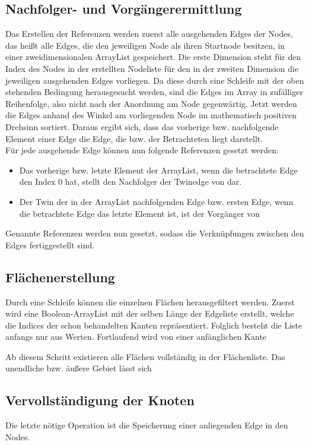 \subsection{Nachfolger- und Vorgängerermittlung}
Das Erstellen der Referenzen werden zuerst alle ausgehenden Edges der Nodes, das heißt alle Edges, die den jeweiligen Node als ihren Startnode besitzen, in einer zweidimensionalen ArrayList gespeichert.
Die erste Dimension steht für den Index des Nodes in der erstellten Nodeliste für den in der zweiten Dimension die jeweiligen ausgehenden Edges vorliegen.
Da diese durch eine  Schleife mit der oben stehenden Bedingung herausgesucht werden, sind die Edges im Array in zufälliger Reihenfolge, also nicht nach der Anordnung am Node gegenwärtig.
Jetzt werden die Edges anhand des  Winkel am vorliegenden Node im mathematisch positiven Drehsinn sortiert.
Daraus ergibt sich, dass das vorherige bzw. nachfolgende Element einer Edge die Edge, die  bzw.  der Betrachteten liegt darstellt.\\
Für jede ausgehende Edge  können nun folgende Referenzen gesetzt werden:
\begin{itemize}
	\item Das vorherige bzw. letzte Element der ArrayList, wenn die betrachtete Edge den Index 0 hat, stellt den Nachfolger der Twinedge von  dar.
	\item Der Twin der in der ArrayList nachfolgenden Edge bzw. ersten Edge, wenn die betrachtete Edge das letzte Element ist, ist der Vorgänger von 
\end{itemize}
Genannte Referenzen werden nun gesetzt, sodass die Verknüpfungen zwischen den Edges fertiggestellt sind.
\subsection{Flächenerstellung}
Durch eine Schleife können die einzelnen Flächen herausgefiltert werden.
Zuerst wird eine Boolean-ArrayList mit der selben Länge der Edgeliste erstellt, welche die Indices der schon behandelten Kanten repräsentiert.
Folglich besteht die Liste anfangs nur aus  Werten.
Fortlaufend wird von einer anfänglichen Kante   

Ab diesem Schritt existieren alle Flächen vollständig in der Flächenliste.
Das unendliche bzw. äußere Gebiet lässt sich 


\subsection{Vervollständigung der Knoten}
Die letzte nötige Operation ist die Speicherung einer anliegenden Edge in den Nodes.